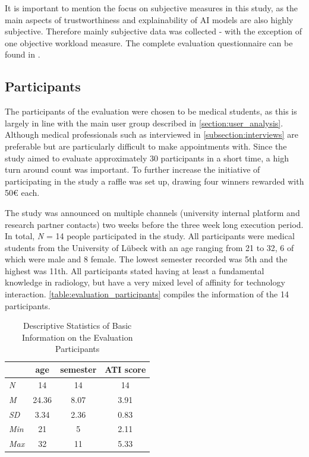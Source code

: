 \documentclass[11pt,a4paper,english]{scrreprt}
\begin{document}
It is important to mention the focus on subjective measures in this study, as the main aspects of trustworthiness and explainability of AI models are also highly subjective. Therefore mainly subjective data was collected - with the exception of one objective workload measure. The complete evaluation questionnaire can be found in .

\subsection{Participants}
The participants of the evaluation were chosen to be medical students, as this is largely in line with the main user group described in \autoref{section:user_analysis}. Although medical professionals such as interviewed in \autoref{subsection:interviews} are preferable but are particularly difficult to make appointments with. Since the study aimed to evaluate approximately 30 participants in a short time, a high turn around count was important. To further increase the initiative of participating in the study a raffle was set up, drawing four winners rewarded with 50€ each.

The study was announced on multiple channels (university internal platform and research partner contacts) two weeks before the three week long execution period. In total, \textit{N} = 14 people participated in the study. All participants were medical students from the University of Lübeck with an age ranging from 21 to 32, 6 of which were male and 8 female. The lowest semester recorded was 5th and the highest was 11th. All participants stated having at least a fundamental knowledge in radiology, but have a very mixed level of affinity for technology interaction. \autoref{table:evaluation_participants} compiles the information of the 14 participants.

\begin{table}[htbp]
    \centering
    \begin{tabularx}{0.45\textwidth}{ l c c c }
        \toprule
        & age & semester & ATI score \\
        \midrule
        \textit{N} & 14 & 14 & 14 \\
        \textit{M} & 24.36 & 8.07 & 3.91 \\
        \textit{SD} & 3.34 & 2.36 & 0.83 \\
        \textit{Min} & 21 & 5 & 2.11 \\
        \textit{Max} & 32 & 11 & 5.33 \\
        \bottomrule
    \end{tabularx}
    \caption{Descriptive Statistics of Basic Information on the Evaluation Participants}
    \label{table:evaluation_participants}
\end{table}
\end{document}
